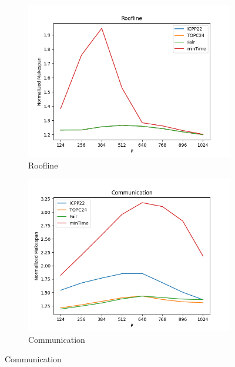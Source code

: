 \documentclass{article}
\begin{document}
\begin{figure}[htbp]
\centering
\begin{subfigure}[b]{0.32\textwidth}\includegraphics[width=\textwidth]{Results/P/P_Roofline}\caption{Roofline}\label{fig:lines_figures_P_Roofline}\end{subfigure}
\hfill
\begin{subfigure}[b]{0.32\textwidth}\includegraphics[width=\textwidth]{Results/P/P_Communication}\caption{Communication}\label{fig:lines_figures_P_Communication}\end{subfigure}
\hfill

\end{figure}
\end{document}
